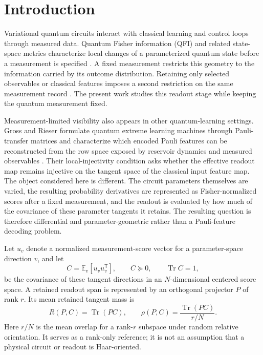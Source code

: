 
\section{Introduction}

Variational quantum circuits interact with classical learning and control loops through measured data. Quantum Fisher information (QFI) and related state-space metrics characterize local changes of a parameterized quantum state before a measurement is specified \cite{BraunsteinCaves1994,Stokes2020,Haug2021}. A fixed measurement restricts this geometry to the information carried by its outcome distribution. Retaining only selected observables or classical features imposes a second restriction on the same measurement record \cite{BraunsteinCaves1994,HottaOzawa2004,LuLuoOh2012}. The present work studies this readout stage while keeping the quantum measurement fixed.

Measurement-limited visibility also appears in other quantum-learning settings. Gross and Rieser formulate quantum extreme learning machines through Pauli-transfer matrices and characterize which encoded Pauli features can be reconstructed from the row space exposed by reservoir dynamics and measured observables \cite{GrossRieser2026}. Their local-injectivity condition asks whether the effective readout map remains injective on the tangent space of the classical input feature map. The object considered here is different. The circuit parameters themselves are varied, the resulting probability derivatives are represented as Fisher-normalized scores after a fixed measurement, and the readout is evaluated by how much of the covariance of these parameter tangents it retains. The resulting question is therefore differential and parameter-geometric rather than a Pauli-feature decoding problem.

Let $u_v$ denote a normalized measurement-score vector for a parameter-space direction $v$, and let
\begin{equation}
C=\mathbb{E}_v[u_vu_v^{\mathsf T}],
\qquad C\succeq0,
\qquad \operatorname{Tr}C=1,
\end{equation}
be the covariance of these tangent directions in an $N$-dimensional centered score space. A retained readout span is represented by an orthogonal projector $P$ of rank $r$. Its mean retained tangent mass is
\begin{equation}
R(P,C)=\operatorname{Tr}(PC),
\qquad
\rho(P,C)=\frac{\operatorname{Tr}(PC)}{r/N}.
\label{eq:aqt-intro-rho}
\end{equation}
Here $r/N$ is the mean overlap for a rank-$r$ subspace under random relative orientation. It serves as a rank-only reference; it is not an assumption that a physical circuit or readout is Haar-oriented.

